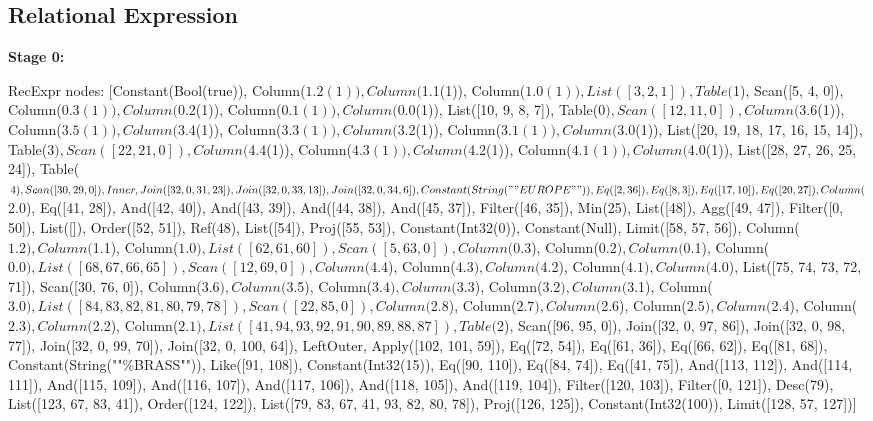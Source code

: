 \documentclass[a4paper,12pt]{scrreprt}
\begin{document}
\subsection{Relational Expression}
\textbf{Stage 0:}
\begin{exprlisting}
    RecExpr { nodes: [Constant(Bool(true)), Column($1.2(1)), Column($1.1(1)), Column($1.0(1)), List([3, 2, 1]), Table($1), Scan([5, 4, 0]), Column($0.3(1)), Column($0.2(1)), Column($0.1(1)), Column($0.0(1)), List([10, 9, 8, 7]), Table($0), Scan([12, 11, 0]), Column($3.6(1)), Column($3.5(1)), Column($3.4(1)), Column($3.3(1)), Column($3.2(1)), Column($3.1(1)), Column($3.0(1)), List([20, 19, 18, 17, 16, 15, 14]), Table($3), Scan([22, 21, 0]), Column($4.4(1)), Column($4.3(1)), Column($4.2(1)), Column($4.1(1)), Column($4.0(1)), List([28, 27, 26, 25, 24]), Table($4), Scan([30, 29, 0]), Inner, Join([32, 0, 31, 23]), Join([32, 0, 33, 13]), Join([32, 0, 34, 6]), Constant(String(""EUROPE"")), Eq([2, 36]), Eq([8, 3]), Eq([17, 10]), Eq([20, 27]), Column($2.0), Eq([41, 28]), And([42, 40]), And([43, 39]), And([44, 38]), And([45, 37]), Filter([46, 35]), Min(25), List([48]), Agg([49, 47]), Filter([0, 50]), List([]), Order([52, 51]), Ref(48), List([54]), Proj([55, 53]), Constant(Int32(0)), Constant(Null), Limit([58, 57, 56]), Column($1.2), Column($1.1), Column($1.0), List([62, 61, 60]), Scan([5, 63, 0]), Column($0.3), Column($0.2), Column($0.1), Column($0.0), List([68, 67, 66, 65]), Scan([12, 69, 0]), Column($4.4), Column($4.3), Column($4.2), Column($4.1), Column($4.0), List([75, 74, 73, 72, 71]), Scan([30, 76, 0]), Column($3.6), Column($3.5), Column($3.4), Column($3.3), Column($3.2), Column($3.1), Column($3.0), List([84, 83, 82, 81, 80, 79, 78]), Scan([22, 85, 0]), Column($2.8), Column($2.7), Column($2.6), Column($2.5), Column($2.4), Column($2.3), Column($2.2), Column($2.1), List([41, 94, 93, 92, 91, 90, 89, 88, 87]), Table($2), Scan([96, 95, 0]), Join([32, 0, 97, 86]), Join([32, 0, 98, 77]), Join([32, 0, 99, 70]), Join([32, 0, 100, 64]), LeftOuter, Apply([102, 101, 59]), Eq([72, 54]), Eq([61, 36]), Eq([66, 62]), Eq([81, 68]), Constant(String(""\%BRASS"")), Like([91, 108]), Constant(Int32(15)), Eq([90, 110]), Eq([84, 74]), Eq([41, 75]), And([113, 112]), And([114, 111]), And([115, 109]), And([116, 107]), And([117, 106]), And([118, 105]), And([119, 104]), Filter([120, 103]), Filter([0, 121]), Desc(79), List([123, 67, 83, 41]), Order([124, 122]), List([79, 83, 67, 41, 93, 82, 80, 78]), Proj([126, 125]), Constant(Int32(100)), Limit([128, 57, 127])] }

\end{exprlisting}
\end{document}
